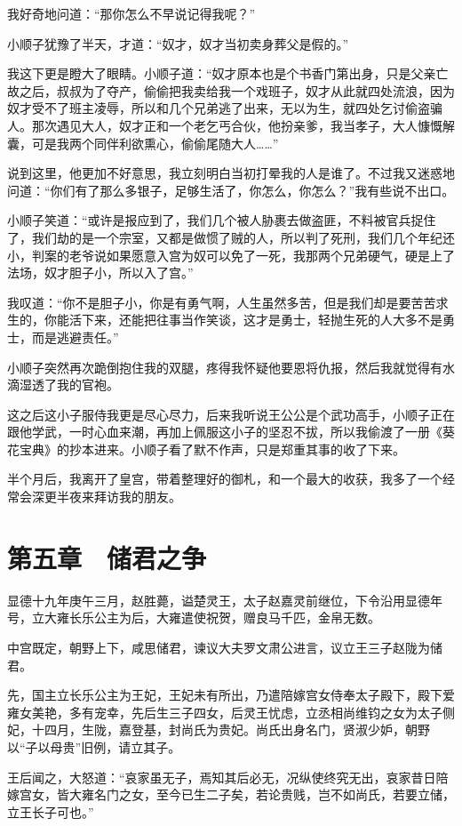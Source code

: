 我好奇地问道：“那你怎么不早说记得我呢？”

小顺子犹豫了半天，才道：“奴才，奴才当初卖身葬父是假的。”

我这下更是瞪大了眼睛。小顺子道：“奴才原本也是个书香门第出身，只是父亲亡故之后，叔叔为了夺产，偷偷把我卖给我一个戏班子，奴才从此就四处流浪，因为奴才受不了班主凌辱，所以和几个兄弟逃了出来，无以为生，就四处乞讨偷盗骗人。那次遇见大人，奴才正和一个老乞丐合伙，他扮亲爹，我当孝子，大人慷慨解囊，可是我两个同伴利欲熏心，偷偷尾随大人……”

说到这里，他更加不好意思，我立刻明白当初打晕我的人是谁了。不过我又迷惑地问道：“你们有了那么多银子，足够生活了，你怎么，你怎么？”我有些说不出口。

小顺子笑道：“或许是报应到了，我们几个被人胁裹去做盗匪，不料被官兵捉住了，我们劫的是一个宗室，又都是做惯了贼的人，所以判了死刑，我们几个年纪还小，判案的老爷说如果愿意入宫为奴可以免了一死，我那两个兄弟硬气，硬是上了法场，奴才胆子小，所以入了宫。”

我叹道：“你不是胆子小，你是有勇气啊，人生虽然多苦，但是我们却是要苦苦求生的，你能活下来，还能把往事当作笑谈，这才是勇士，轻抛生死的人大多不是勇士，而是逃避责任。”

小顺子突然再次跪倒抱住我的双腿，疼得我怀疑他要恩将仇报，然后我就觉得有水滴湿透了我的官袍。

这之后这小子服侍我更是尽心尽力，后来我听说王公公是个武功高手，小顺子正在跟他学武，一时心血来潮，再加上佩服这小子的坚忍不拔，所以我偷渡了一册《葵花宝典》的抄本进来。小顺子看了默不作声，只是郑重其事的收了下来。

半个月后，我离开了皇宫，带着整理好的御札，和一个最大的收获，我多了一个经常会深更半夜来拜访我的朋友。

\chapter{第五章　储君之争}

显德十九年庚午三月，赵胜薨，谥楚灵王，太子赵嘉灵前继位，下令沿用显德年号，立大雍长乐公主为后，大雍遣使祝贺，赠良马千匹，金帛无数。

中宫既定，朝野上下，咸思储君，谏议大夫罗文肃公进言，议立王三子赵陇为储君。

先，国主立长乐公主为王妃，王妃未有所出，乃遣陪嫁宫女侍奉太子殿下，殿下爱雍女美艳，多有宠幸，先后生三子四女，后灵王忧虑，立丞相尚维钧之女为太子侧妃，十四月，生陇，嘉登基，封尚氏为贵妃。尚氏出身名门，贤淑少妒，朝野以“子以母贵”旧例，请立其子。

王后闻之，大怒道：“哀家虽无子，焉知其后必无，况纵使终究无出，哀家昔日陪嫁宫女，皆大雍名门之女，至今已生二子矣，若论贵贱，岂不如尚氏，若要立储，立王长子可也。”

